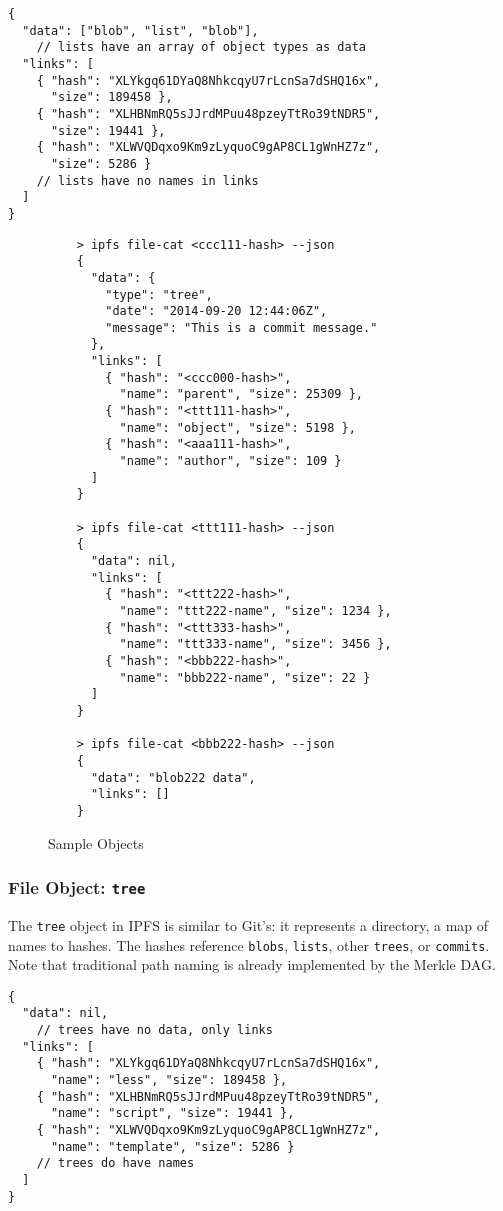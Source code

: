 \documentclass{sig-alternate}
\begin{document}
\begin{verbatim}
{
  "data": ["blob", "list", "blob"],
    // lists have an array of object types as data
  "links": [
    { "hash": "XLYkgq61DYaQ8NhkcqyU7rLcnSa7dSHQ16x",
      "size": 189458 },
    { "hash": "XLHBNmRQ5sJJrdMPuu48pzeyTtRo39tNDR5",
      "size": 19441 },
    { "hash": "XLWVQDqxo9Km9zLyquoC9gAP8CL1gWnHZ7z",
      "size": 5286 }
    // lists have no names in links
  ]
}
\end{verbatim}


\begin{figure}

\begin{verbatim}
    > ipfs file-cat <ccc111-hash> --json
    {
      "data": {
        "type": "tree",
        "date": "2014-09-20 12:44:06Z",
        "message": "This is a commit message."
      },
      "links": [
        { "hash": "<ccc000-hash>",
          "name": "parent", "size": 25309 },
        { "hash": "<ttt111-hash>",
          "name": "object", "size": 5198 },
        { "hash": "<aaa111-hash>",
          "name": "author", "size": 109 }
      ]
    }

    > ipfs file-cat <ttt111-hash> --json
    {
      "data": nil,
      "links": [
        { "hash": "<ttt222-hash>",
          "name": "ttt222-name", "size": 1234 },
        { "hash": "<ttt333-hash>",
          "name": "ttt333-name", "size": 3456 },
        { "hash": "<bbb222-hash>",
          "name": "bbb222-name", "size": 22 }
      ]
    }

    > ipfs file-cat <bbb222-hash> --json
    {
      "data": "blob222 data",
      "links": []
    }
\end{verbatim}
\caption{Sample Objects} \label{fig:sample-objects}
\end{figure}


\subsubsection{File Object: \texttt{tree}}

The \texttt{tree} object in IPFS is similar to Git's: it represents a
directory, a map of names to hashes. The hashes reference \texttt{blobs}, \texttt{lists}, other \texttt{trees}, or \texttt{commits}. Note that traditional path naming is already implemented by the Merkle DAG.

\begin{verbatim}
{
  "data": nil,
    // trees have no data, only links
  "links": [
    { "hash": "XLYkgq61DYaQ8NhkcqyU7rLcnSa7dSHQ16x",
      "name": "less", "size": 189458 },
    { "hash": "XLHBNmRQ5sJJrdMPuu48pzeyTtRo39tNDR5",
      "name": "script", "size": 19441 },
    { "hash": "XLWVQDqxo9Km9zLyquoC9gAP8CL1gWnHZ7z",
      "name": "template", "size": 5286 }
    // trees do have names
  ]
}
\end{verbatim}
\end{document}

